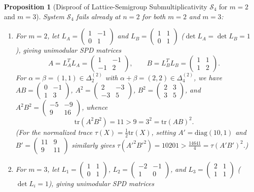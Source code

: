 \documentclass[11pt,a4paper]{article}
\newtheorem{proposition}[theorem]{Proposition}
\theoremstyle{definition}
\theoremstyle{remark}
\newcommand{\tr}{\mathrm{tr}}
\newcommand{\DeltaLat}{\Delta}
\begin{document}
\begin{proposition}[Disproof of Lattice-Semigroup Submultiplicativity $\mathcal{S}_4$ for $m = 2$ and $m = 3$]\label{prop:submult}
System $\mathcal{S}_4$ fails already at $n = 2$ for both $m = 2$ and $m = 3$:
\begin{enumerate}
\item For $m = 2$, let $L_A = \begin{pmatrix} 1 & -1 \\ 0 & 1 \end{pmatrix}$ and $L_B = \begin{pmatrix} 1 & 1 \\ 0 & 1 \end{pmatrix}$ ($\det L_A = \det L_B = 1$), giving unimodular SPD matrices
\[
A = L_A^T L_A = \begin{pmatrix} 1 & -1 \\ -1 & 2 \end{pmatrix}, \qquad
B = L_B^T L_B = \begin{pmatrix} 1 & 1 \\ 1 & 2 \end{pmatrix}.
\]
For $\alpha = \beta = (1, 1) \in \DeltaLat_2^{(2)}$ with $\alpha + \beta = (2, 2) \in \DeltaLat_4^{(2)}$, we have $AB = \begin{pmatrix} 0 & -1 \\ 1 & 3 \end{pmatrix}$, $A^2 = \begin{pmatrix} 2 & -3 \\ -3 & 5 \end{pmatrix}$, $B^2 = \begin{pmatrix} 2 & 3 \\ 3 & 5 \end{pmatrix}$, and $A^2 B^2 = \begin{pmatrix} -5 & -9 \\ 9 & 16 \end{pmatrix}$, whence
\[
\tr(A^2 B^2) = 11 > 9 = 3^2 = \tr(AB)^2.
\]
(For the normalized trace $\tau(X) = \frac{1}{2}\tr(X)$, setting $A' = \mathrm{diag}(10,1)$ and $B' = \begin{pmatrix} 11 & 9 \\ 9 & 11 \end{pmatrix}$ similarly gives $\tau(A'^2 B'^2) = 10201 > \frac{14641}{4} = \tau(A' B')^2$.)
\item For $m = 3$, let $L_1 = \begin{pmatrix} 1 & 1 \\ 0 & 1 \end{pmatrix}$, $L_2 = \begin{pmatrix} -2 & -1 \\ 1 & 0 \end{pmatrix}$, and $L_3 = \begin{pmatrix} 2 & 1 \\ 1 & 1 \end{pmatrix}$ ($\det L_i = 1$), giving unimodular SPD matrices

\end{enumerate}
\end{proposition}
\end{document}
